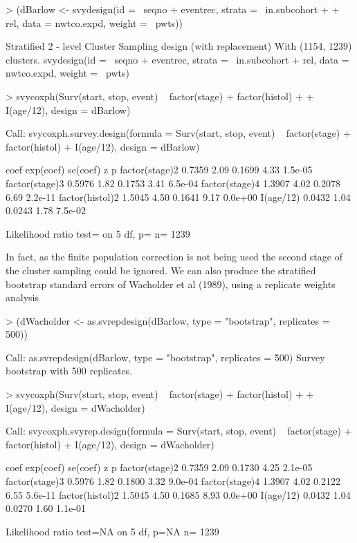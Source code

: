 \documentclass{article}
\begin{document}
\begin{Schunk}
\begin{Sinput}
> (dBarlow <- svydesign(id = ~seqno + eventrec, strata = ~in.subcohort + 
+     rel, data = nwtco.expd, weight = ~pwts))
\end{Sinput}
\begin{Soutput}
Stratified 2 - level Cluster Sampling design (with replacement)
With (1154, 1239) clusters.
svydesign(id = ~seqno + eventrec, strata = ~in.subcohort + rel, 
    data = nwtco.expd, weight = ~pwts)
\end{Soutput}
\begin{Sinput}
> svycoxph(Surv(start, stop, event) ~ factor(stage) + factor(histol) + 
+     I(age/12), design = dBarlow)
\end{Sinput}
\begin{Soutput}
Call:
svycoxph.survey.design(formula = Surv(start, stop, event) ~ factor(stage) + 
    factor(histol) + I(age/12), design = dBarlow)


                  coef exp(coef) se(coef)    z       p
factor(stage)2  0.7359      2.09   0.1699 4.33 1.5e-05
factor(stage)3  0.5976      1.82   0.1753 3.41 6.5e-04
factor(stage)4  1.3907      4.02   0.2078 6.69 2.2e-11
factor(histol)2 1.5045      4.50   0.1641 9.17 0.0e+00
I(age/12)       0.0432      1.04   0.0243 1.78 7.5e-02

Likelihood ratio test=  on 5 df, p=  n= 1239 
\end{Soutput}
\end{Schunk}

In fact, as the finite population correction is not being used the second stage of the cluster sampling could be ignored.   We can also produce the stratified bootstrap standard errors of Wacholder et al (1989), using a replicate weights analysis

\begin{Schunk}
\begin{Sinput}
> (dWacholder <- as.svrepdesign(dBarlow, type = "bootstrap", replicates = 500))
\end{Sinput}
\begin{Soutput}
Call: as.svrepdesign(dBarlow, type = "bootstrap", replicates = 500)
Survey bootstrap with 500 replicates.
\end{Soutput}
\begin{Sinput}
> svycoxph(Surv(start, stop, event) ~ factor(stage) + factor(histol) + 
+     I(age/12), design = dWacholder)
\end{Sinput}
\begin{Soutput}
Call:
svycoxph.svyrep.design(formula = Surv(start, stop, event) ~ factor(stage) + 
    factor(histol) + I(age/12), design = dWacholder)


                  coef exp(coef) se(coef)    z       p
factor(stage)2  0.7359      2.09   0.1730 4.25 2.1e-05
factor(stage)3  0.5976      1.82   0.1800 3.32 9.0e-04
factor(stage)4  1.3907      4.02   0.2122 6.55 5.6e-11
factor(histol)2 1.5045      4.50   0.1685 8.93 0.0e+00
I(age/12)       0.0432      1.04   0.0270 1.60 1.1e-01

Likelihood ratio test=NA  on 5 df, p=NA  n= 1239 
\end{Soutput}
\end{Schunk}
\end{document}
